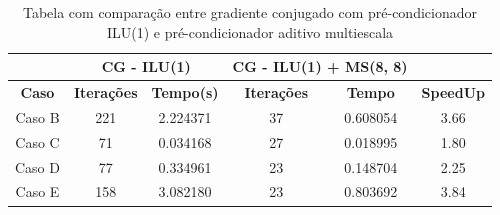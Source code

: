 \begin{table}[]

\caption{Tabela com comparação entre gradiente conjugado com pré-condicionador ILU(1) e pré-condicionador aditivo multiescala} \label{tab:comparacaoILU}

\begin{tabular}{c|c|c|c|c|c}
\cline{2-5}
                                    & \multicolumn{2}{c|}{\textbf{CG - ILU(1)}} & \multicolumn{2}{c|}{\textbf{CG - ILU(1) + MS(8, 8)}} &                                       \\ \hline
\multicolumn{1}{|c|}{\textbf{Caso}} & \textbf{Iterações}   & \textbf{Tempo(s)}  & \textbf{Iterações}          & \textbf{Tempo}         & \multicolumn{1}{c|}{\textbf{SpeedUp}} \\ \hline
\multicolumn{1}{|c|}{Caso B}        & 221                  & 2.224371           & 37                          & 0.608054               & \multicolumn{1}{c|}{3.66}             \\ \hline
\multicolumn{1}{|c|}{Caso C}        & 71                   & 0.034168           & 27                          & 0.018995               & \multicolumn{1}{c|}{1.80}             \\ \hline
\multicolumn{1}{|c|}{Caso D}        & 77                   & 0.334961           & 23                          & 0.148704               & \multicolumn{1}{c|}{2.25}             \\ \hline
\multicolumn{1}{|c|}{Caso E}        & 158                  & 3.082180           & 23                          & 0.803692               & \multicolumn{1}{c|}{3.84}             \\ \hline
\end{tabular}
\end{table}


